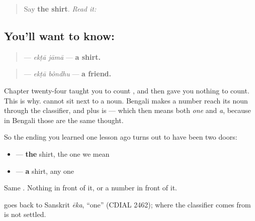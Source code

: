 \label{lesson:BN-C20-ekta}



\begin{quote}
Say \textbf{the shirt}. \emph{Read it:} \textbf{}
\end{quote}

\subsection*{You'll want to know: }
\begin{quote}
\textbf{ } — \emph{ekṭā jāmā} — \textbf{a shirt.}
\end{quote}

\begin{quote}
\textbf{ } — \emph{ekṭā bôndhu} — \textbf{a friend.}
\end{quote}

Chapter twenty-four taught you to count \textbf{    }, and then gave you nothing to count. This is why. \textbf{} cannot sit next to a noun. Bengali makes a number reach its noun through the classifier, and \textbf{} plus \textbf{} is \textbf{} — which then means both \emph{one} and \emph{a}, because in Bengali those are the same thought.

So the ending you learned one lesson ago turns out to have been two doors:

\begin{itemize}
\raggedright
  \item \textbf{} — \textbf{the} shirt, the one we mean
  \item \textbf{ } — \textbf{a} shirt, any one
\end{itemize}

Same \textbf{}. Nothing in front of it, or a number in front of it.

\begin{cousinweb}
\textbf{} goes back to Sanskrit \emph{ēka}, \textquotedblleft{}one\textquotedblright{} (CDIAL 2462); where the classifier \textbf{} comes from is not settled.
\end{cousinweb}


